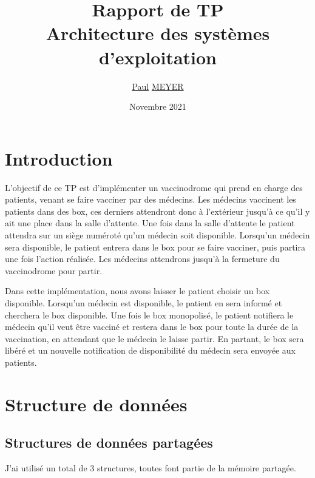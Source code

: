 \documentclass[a4paper]{article}
\title{Rapport de TP \\ Architecture des systèmes d'exploitation}
\author{\underline{Paul} \underline{MEYER}}
\date{Novembre 2021}
\makeatletter
\newenvironment{expl}{%
  \begin{list}{}{%
    \small\itshape%
    \topsep\z@%
    \listparindent0pt%
    \parsep0.75\baselineskip%
    \setlength{\leftmargin}{20mm}%
    \setlength{\rightmargin}{20mm}%
  }
    \item[]}%
    {\end{list}}
\makeatother
\begin{document}
  \maketitle

  \tableofcontents

  \listoffigures

  \newpage

  \section{Introduction}

  L'objectif de ce TP est d'implémenter un vaccinodrome qui prend en charge des patients, venant se faire vacciner par des médecins. Les médecins vaccinent les patients dans des box, ces derniers attendront donc à l'extérieur jusqu'à
  ce qu'il y ait une place dans la salle d'attente. Une fois dans la salle d'attente le patient attendra sur un siège numéroté qu'un médecin soit disponible. Lorsqu'un médecin sera disponible, le patient entrera dans le box pour se faire vacciner, puis partira une fois l'action réalisée. Les médecins attendrons jusqu'à la fermeture du vaccinodrome pour partir.

  Dans cette implémentation, nous avons laisser le patient choisir un box disponible.
  Lorsqu'un médecin est disponible, le patient en sera informé et cherchera le box disponible.
  Une fois le box monopolisé, le patient notifiera le médecin qu'il veut être vacciné et restera dans le box pour toute la durée de la vaccination, en attendant que le médecin le laisse partir. En partant, le box sera libéré et un nouvelle notification de disponibilité du médecin sera envoyée aux patients.
  \newpage
  \section{Structure de données}

  \subsection{Structures de données partagées}\label{sec-shm}

  J'ai utilisé un total de 3 structures, toutes font partie de la mémoire partagée.
\end{document}
